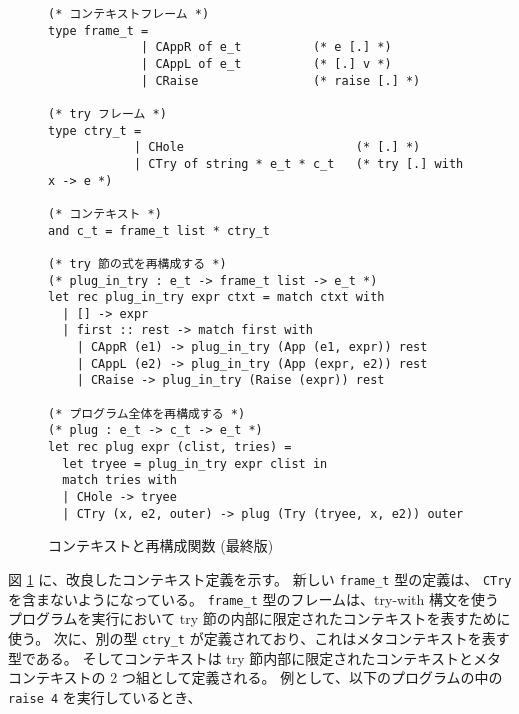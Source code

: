 \begin{figure}
\begin{spacing}{0.8}
\begin{verbatim}
(* コンテキストフレーム *)
type frame_t = 
             | CAppR of e_t          (* e [.] *)
             | CAppL of e_t          (* [.] v *)
             | CRaise                (* raise [.] *)

(* try フレーム *)
type ctry_t = 
            | CHole                        (* [.] *)
            | CTry of string * e_t * c_t   (* try [.] with x -> e *)

(* コンテキスト *)
and c_t = frame_t list * ctry_t

(* try 節の式を再構成する *)
(* plug_in_try : e_t -> frame_t list -> e_t *)
let rec plug_in_try expr ctxt = match ctxt with
  | [] -> expr
  | first :: rest -> match first with
    | CAppR (e1) -> plug_in_try (App (e1, expr)) rest
    | CAppL (e2) -> plug_in_try (App (expr, e2)) rest
    | CRaise -> plug_in_try (Raise (expr)) rest

(* プログラム全体を再構成する *)
(* plug : e_t -> c_t -> e_t *)
let rec plug expr (clist, tries) =
  let tryee = plug_in_try expr clist in
  match tries with
  | CHole -> tryee
  | CTry (x, e2, outer) -> plug (Try (tryee, x, e2)) outer
\end{verbatim}
\end{spacing}
  \caption{コンテキストと再構成関数 (最終版)}
  \label{figure:typec}
\end{figure}

図 \ref{figure:typec} に、改良したコンテキスト定義を示す。
新しい \texttt{frame\_t} 型の定義は、 \texttt{CTry} を含まないようになっている。
\texttt{frame\_t} 型のフレームは、try-with 構文を使うプログラムを実行において
try 節の内部に限定されたコンテキストを表すために使う。
次に、別の型 \texttt{ctry\_t} が定義されており、これはメタコンテキストを表す型である。
そしてコンテキストは try 節内部に限定されたコンテキストとメタコンテキストの 2 つ組として定義される。
例として、以下のプログラムの中の \texttt{raise 4} を実行しているとき、

